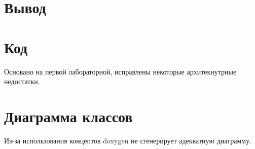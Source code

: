 \documentclass[russian, english]{article}
\begin{document}
\section{Вывод}


\appendix
\section{Код}
Основано на первой лабораторной, исправлены некоторые архитекнутрные недостатки.

\section{Диаграмма классов}
Из-за использования концептов doxygen не сгенерирует адекватную диаграмму.

\end{document}
